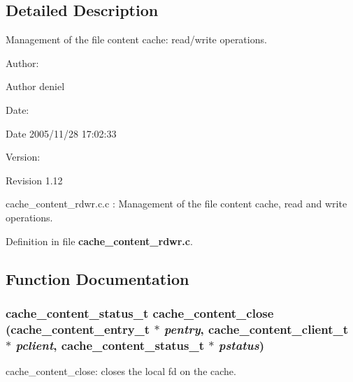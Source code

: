 \subsection{Detailed Description}
Management of the file content cache: read/write operations. 

\begin{Desc}
\item[Author:]\end{Desc}
\begin{Desc}
\item[Author]deniel \end{Desc}
\begin{Desc}
\item[Date:]\end{Desc}
\begin{Desc}
\item[Date]2005/11/28 17:02:33 \end{Desc}
\begin{Desc}
\item[Version:]\end{Desc}
\begin{Desc}
\item[Revision]1.12 \end{Desc}
cache\_\-content\_\-rdwr.c.c : Management of the file content cache, read and write operations. 

Definition in file {\bf cache\_\-content\_\-rdwr.c}.

\subsection{Function Documentation}
\subsubsection[{cache\_\-content\_\-close}]{\setlength{\rightskip}{0pt plus 5cm}cache\_\-content\_\-status\_\-t cache\_\-content\_\-close (cache\_\-content\_\-entry\_\-t $\ast$ {\em pentry}, \/  cache\_\-content\_\-client\_\-t $\ast$ {\em pclient}, \/  cache\_\-content\_\-status\_\-t $\ast$ {\em pstatus})}\label{cache__content__rdwr_8c_8ebf4fc74d42f34827e51a1ec48eabd3}


cache\_\-content\_\-close: closes the local fd on the cache.

